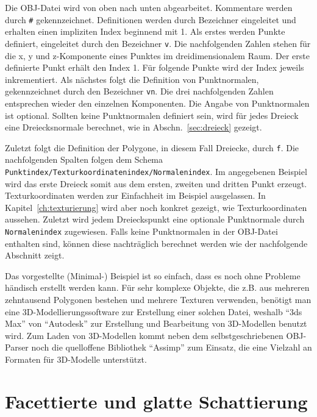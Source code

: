 Die OBJ-Datei wird von oben nach unten abgearbeitet. Kommentare werden durch \texttt{\#} gekennzeichnet.
Definitionen werden durch Bezeichner eingeleitet und erhalten einen impliziten Index beginnend mit 1.
Als erstes werden Punkte definiert, eingeleitet durch den Bezeichner \texttt{v}. Die nachfolgenden Zahlen stehen für die x, y und z-Komponente eines Punktes im dreidimensionalem Raum. Der erste definierte Punkt erhält den Index 1. Für folgende Punkte wird der Index jeweils inkrementiert.
Als nächstes folgt die Definition von Punktnormalen, gekennzeichnet durch den Bezeichner \texttt{vn}. Die drei nachfolgenden Zahlen entsprechen wieder den einzelnen Komponenten. Die Angabe von Punktnormalen ist optional. 
Sollten keine Punktnormalen definiert sein, wird für jedes Dreieck eine Dreiecksnormale berechnet, wie in Abschn.~\ref{sec:dreieck} gezeigt.

 Zuletzt folgt die Definition der Polygone, in diesem Fall Dreiecke, durch \texttt{f}. Die nachfolgenden Spalten folgen dem Schema \texttt{Punktindex/Texturkoordinatenindex/Normalenindex}. Im angegebenen Beispiel wird das erste Dreieck somit aus dem ersten, zweiten und dritten Punkt erzeugt. Texturkoordinaten werden zur Einfachheit im Beispiel ausgelassen. In Kapitel~\ref{ch:texturierung} wird aber noch konkret gezeigt, wie Texturkoordinaten aussehen. Zuletzt wird jedem Dreieckspunkt eine optionale Punktnormale durch \texttt{Normalenindex} zugewiesen. Falls keine Punktnormalen in der OBJ-Datei enthalten sind, können diese nachträglich berechnet werden wie der nachfolgende Abschnitt zeigt.
 
 Das vorgestellte (Minimal-) Beispiel ist so einfach, dass es noch ohne Probleme händisch erstellt werden kann. Für sehr komplexe Objekte, die z.B. aus mehreren zehntausend Polygonen bestehen und mehrere Texturen verwenden, benötigt man eine 3D-Modellierungssoftware zur Erstellung einer solchen Datei, weshalb "`3ds Max"' von "`Autodesk"' zur Erstellung und Bearbeitung von 3D-Modellen benutzt wird. Zum Laden von 3D-Modellen kommt neben dem selbstgeschriebenen OBJ-Parser noch die quelloffene Bibliothek "`Assimp"' zum Einsatz, die eine Vielzahl an Formaten für 3D-Modelle unterstützt.


\section{Facettierte und glatte Schattierung} \label{sec:facetierte_und_glatte_schattierung}

